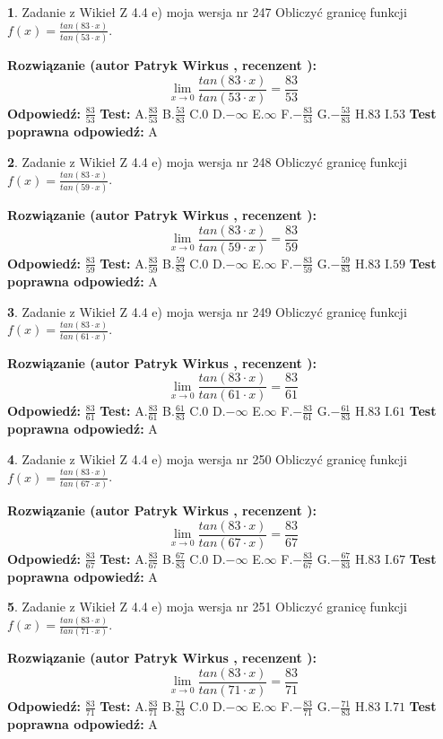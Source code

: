 \documentclass[12pt, a4paper]{article}
\theoremstyle{definition} %
\newtheorem{zad}{}
\newcommand{\zadStart}[1]{\begin{zad}#1\newline}
\newcommand{\zadStop}{\end{zad}}
\newcommand{\rozwStart}[2]{\noindent \textbf{Rozwiązanie (autor #1 , recenzent #2): }\newline}
\newcommand{\rozwStop}{\newline}
\newcommand{\odpStart}{\noindent \textbf{Odpowiedź:}\newline}
\newcommand{\odpStop}{\newline}
\newcommand{\testStart}{\noindent \textbf{Test:}\newline}
\newcommand{\testStop}{\newline}
\newcommand{\kluczStart}{\noindent \textbf{Test poprawna odpowiedź:}\newline}
\newcommand{\kluczStop}{\newline}
\begin{document}
\zadStart{Zadanie z Wikieł Z 4.4 e) moja wersja nr 247}
Obliczyć granicę funkcji $f(x)=\frac{tan(83\cdot x)}{tan(53\cdot x)}$.
\zadStop
\rozwStart{Patryk Wirkus}{}
$$\lim\limits_{x\to 0}\frac{tan(83\cdot x)}{tan(53\cdot x)}=
\frac{83}{53}$$
\rozwStop
\odpStart
$\frac{83}{53}$
\odpStop
\testStart
A.$\frac{83}{53}$
B.$\frac{53}{83}$
C.$0$
D.$-\infty$
E.$\infty$
F.$-\frac{83}{53}$
G.$-\frac{53}{83}$
H.$83$
I.$53$
\testStop
\kluczStart
A
\kluczStop



\zadStart{Zadanie z Wikieł Z 4.4 e) moja wersja nr 248}
Obliczyć granicę funkcji $f(x)=\frac{tan(83\cdot x)}{tan(59\cdot x)}$.
\zadStop
\rozwStart{Patryk Wirkus}{}
$$\lim\limits_{x\to 0}\frac{tan(83\cdot x)}{tan(59\cdot x)}=
\frac{83}{59}$$
\rozwStop
\odpStart
$\frac{83}{59}$
\odpStop
\testStart
A.$\frac{83}{59}$
B.$\frac{59}{83}$
C.$0$
D.$-\infty$
E.$\infty$
F.$-\frac{83}{59}$
G.$-\frac{59}{83}$
H.$83$
I.$59$
\testStop
\kluczStart
A
\kluczStop



\zadStart{Zadanie z Wikieł Z 4.4 e) moja wersja nr 249}
Obliczyć granicę funkcji $f(x)=\frac{tan(83\cdot x)}{tan(61\cdot x)}$.
\zadStop
\rozwStart{Patryk Wirkus}{}
$$\lim\limits_{x\to 0}\frac{tan(83\cdot x)}{tan(61\cdot x)}=
\frac{83}{61}$$
\rozwStop
\odpStart
$\frac{83}{61}$
\odpStop
\testStart
A.$\frac{83}{61}$
B.$\frac{61}{83}$
C.$0$
D.$-\infty$
E.$\infty$
F.$-\frac{83}{61}$
G.$-\frac{61}{83}$
H.$83$
I.$61$
\testStop
\kluczStart
A
\kluczStop



\zadStart{Zadanie z Wikieł Z 4.4 e) moja wersja nr 250}
Obliczyć granicę funkcji $f(x)=\frac{tan(83\cdot x)}{tan(67\cdot x)}$.
\zadStop
\rozwStart{Patryk Wirkus}{}
$$\lim\limits_{x\to 0}\frac{tan(83\cdot x)}{tan(67\cdot x)}=
\frac{83}{67}$$
\rozwStop
\odpStart
$\frac{83}{67}$
\odpStop
\testStart
A.$\frac{83}{67}$
B.$\frac{67}{83}$
C.$0$
D.$-\infty$
E.$\infty$
F.$-\frac{83}{67}$
G.$-\frac{67}{83}$
H.$83$
I.$67$
\testStop
\kluczStart
A
\kluczStop



\zadStart{Zadanie z Wikieł Z 4.4 e) moja wersja nr 251}
Obliczyć granicę funkcji $f(x)=\frac{tan(83\cdot x)}{tan(71\cdot x)}$.
\zadStop
\rozwStart{Patryk Wirkus}{}
$$\lim\limits_{x\to 0}\frac{tan(83\cdot x)}{tan(71\cdot x)}=
\frac{83}{71}$$
\rozwStop
\odpStart
$\frac{83}{71}$
\odpStop
\testStart
A.$\frac{83}{71}$
B.$\frac{71}{83}$
C.$0$
D.$-\infty$
E.$\infty$
F.$-\frac{83}{71}$
G.$-\frac{71}{83}$
H.$83$
I.$71$
\testStop
\kluczStart
A
\kluczStop
\end{document}
